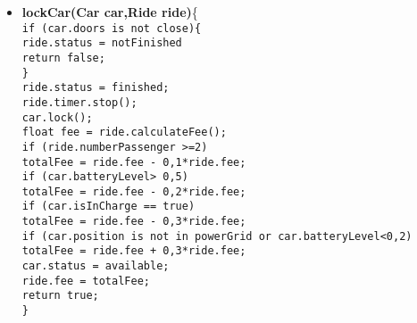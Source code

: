 \begin{itemize}
\item \textbf{lockCar(Car car,Ride ride)}\{\\
\texttt{if (car.doors is not close)\{\\
\tab ride.status = notFinished\\
\tab return false;\\
\tab \}\\
ride.status = finished;\\
ride.timer.stop();\\
car.lock();\\
float fee = ride.calculateFee();\\
if (ride.numberPassenger >=2)\\
\tab totalFee = ride.fee - 0,1*ride.fee;\\
if (car.batteryLevel> 0,5)\\
\tab totalFee = ride.fee - 0,2*ride.fee;\\
if (car.isInCharge == true)\\
\tab totalFee = ride.fee - 0,3*ride.fee;\\
if (car.position is not in powerGrid or car.batteryLevel<0,2)\\
\tab totalFee = ride.fee + 0,3*ride.fee;\\
car.status = available;\\
ride.fee = totalFee;\\
return true;\\
\}\\
}
\end{itemize}





